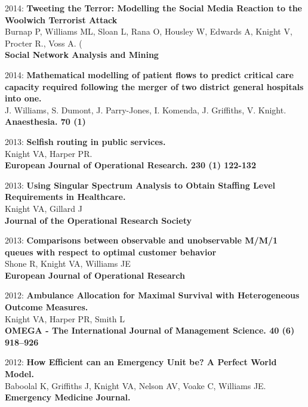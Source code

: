 \documentclass[10pt]{res} %
\begin{document}
\begin{resume}
\begin{etaremune}
\item
2014: \textbf{Tweeting the Terror: Modelling the Social Media Reaction to the Woolwich Terrorist Attack}\\
Burnap P, Williams ML, Sloan L, Rana O, Housley W, Edwards A, Knight V, Procter R., Voss A. (
\\
\textbf{Social Network Analysis and Mining}
\\

\item
2014: \textbf{Mathematical modelling of patient flows to predict critical care capacity required following the merger of two district general hospitals into one.}\\
J. Williams, S. Dumont, J. Parry-Jones, I. Komenda, J. Griffiths, V. Knight.
\\
\textbf{Anaesthesia. 70 (1)}
\\

\item
2013: \textbf{Selfish routing in public services.}\\
Knight VA, Harper PR.
\\
\textbf{European Journal of Operational Research. 230 (1) 122-132}
\\

\item
2013: \textbf{Using Singular Spectrum Analysis to Obtain Staffing Level Requirements in Healthcare.}\\
Knight VA, Gillard J
\\
\textbf{Journal of the Operational Research Society}
\\

\item
2013: \textbf{Comparisons between observable and unobservable M/M/1 queues with respect to optimal customer behavior}\\
Shone R, Knight VA, Williams JE
\\
\textbf{European Journal of Operational Research}
\\

\item
2012: \textbf{Ambulance Allocation for Maximal Survival with Heterogeneous Outcome Measures.}\\
Knight VA, Harper PR, Smith L
\\
\textbf{OMEGA - The International Journal of Management Science. 40 (6) 918--926}
\\

\item
2012: \textbf{How Efficient can an Emergency Unit be? A Perfect World Model.}\\
Baboolal K, Griffiths J, Knight VA, Nelson AV, Voake C, Williams JE.
\\
\textbf{Emergency Medicine Journal.}
\\


\end{etaremune}
\end{resume}
\end{document}
